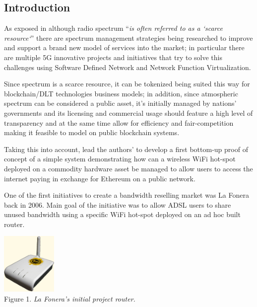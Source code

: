 \documentclass[12pt]{amsart}
\begin{document}
\setlength{\columnsep}{20pt}
\begin{multicols}{2}
\section{Introduction}\label{sec:introduction}

\vspace{0.35cm}
As exposed in \cite{spectrumnh} although radio spectrum
``\textit{is often
  referred to as a `scarce resource`}'' there are
spectrum management strategies
being researched to improve and
support a brand new model of services
into the market; in particular there are
multiple 5G\cite{5g} innovative projects and initiatives
that try to solve this challenges using Software
Defined Network\cite{sdns}
and Network Function Virtualization\cite{nfv}.

\vspace{0.35cm}

Since spectrum is a scarce resource, it can
be tokenized being suited this
way for blockchain/DLT technologies business models;
in addition, since
atmospheric spectrum can be considered a public
asset, it's initially managed by nations' governments
and its licensing and commercial usage should feature
a high level of transparency and at the same time
allow for efficiency and fair-competition making it
feasible to model on public blockchain systems.

\vspace{0.35cm}

Taking this into account, lead the authors' to develop
a first bottom-up proof of concept of a simple system
demonstrating how can a wireless WiFi hot-spot
deployed on a commodity hardware asset\cite{RaspberryPi19}
be managed to allow users to access the internet
paying in exchange for Ethereum on a public network.

\vspace{0.35cm}

One of the first initiatives to create
a bandwidth reselling market was La Fonera\cite{fon}
back in 2006. Main goal of the initiative was
to allow ADSL users to share unused bandwidth using
a specific WiFi hot-spot deployed on an ad hoc
built router.

\begin{center}
  \includegraphics[keepaspectratio, width=0.2\textwidth]{images/lafonera-sourcewikipedia.eps}
  \\
  Figure 1. \textit{La Fonera's initial project router.}
\end{center}


\end{multicols}
\end{document}
